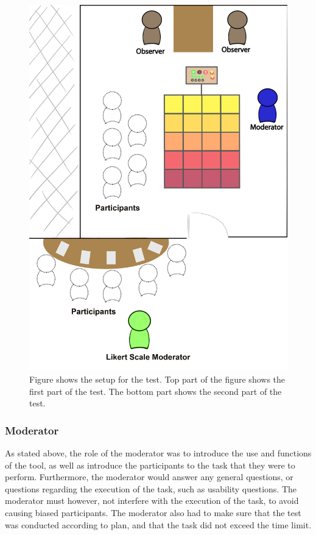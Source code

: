 \begin{figure}[H]
	\centering
	\includegraphics[width=0.7\linewidth]{figure/Evaluation/testSetupPlan.png}
	\caption{Figure shows the setup for the test. Top part of the figure shows the first part of the test. The bottom part shows the second part of the test.}
	\label{fig:testSetupFinal}
\end{figure} 


\subsubsection*{Moderator}
As stated above, the role of the moderator was to introduce the use and functions of the tool, as well as introduce the participants to the task that they were to perform. Furthermore, the moderator would answer any general questions, or questions regarding the execution of the task, such as usability questions. The moderator must however, not interfere with the execution of the task, to avoid causing biased participants\cite{bjoernerBog}. The moderator also had to make sure that the test was conducted according to plan, and that the task did not exceed the time limit.

